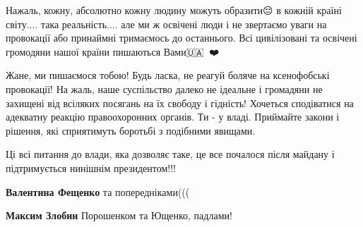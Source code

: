 \begin{itemize}
Нажаль, кожну, абсолютно кожну людину можуть образити😔 в кожній країні
світу.... така реальність.... але ми ж освічені люди і не звертаємо уваги на
провокації або принаймні тримаємось до останнього. Всі цивілізовані та освічені
громодяни нашої країни пишаються Вами🇺🇦💚💜❤️


 

Жане, ми пишаємося тобою! Будь ласка, не реагуй боляче на ксенофобські
провокації! На жаль, наше суспільство далеко не ідеальне і громадяни не
захищені від всіляких посягань на їх свободу і гідність! Хочеться сподіватися
на адекватну реакцію правоохоронних органів. Ти - у владі. Приймайте закони і
рішення, які сприятимуть боротьбі з подібними явищами.


 

Ці всі питання до влади, яка дозволяє таке, це все почалося після майдану і
підтримується нинішнім президентом!!!

\begin{itemize}
 

\textbf{Валентина Фещенко} та попередніками(((

 
\textbf{Максим Злобин} Порошенком та Ющенко, падлами!
\end{itemize}

 


\end{itemize}
